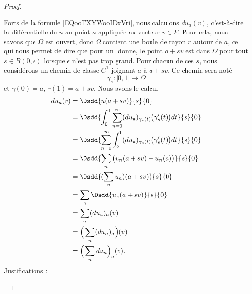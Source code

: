 \begin{proof}
\begin{subproof}
		Forts de la formule \eqref{EQooTXYWooIDxVri}, nous calculons \( du_a(v)\), c'est-à-dire la différentielle de \( u\) au point \( a\) appliquée au vecteur \( v\in F\). Pour cela, nous savons que \( \Omega\) est ouvert, donc \( \Omega\) contient une boule de rayon \( r\) autour de \( a\), ce qui nous permet de dire que pour un \( \) donné, le point \( a+sv\) est dans \( \Omega\) pour tout \( s\in B(0,\epsilon)\) lorsque \( \epsilon\) n'est pas trop grand. Pour chacun de ces \( s\), nous considérons un chemin de classe \( C^1\) joignant \( a\) à \( a+sv\). Ce chemin sera noté
		\begin{equation}
			\gamma_s\colon \mathopen[ 0 , 1 \mathclose]\to \Omega
		\end{equation}
		et \( \gamma(0)=a\), \( \gamma(1)=a+sv\). Nous avons le calcul
		\begin{subequations}
			\begin{align}
				du_a(v) & =\Dsdd{ u(a+sv) }{s}{0}                                                                                                    \\
				        & =\Dsdd{ \int_0^1\sum_{n=0}^{\infty}(du_n)_{\gamma_s(t)}\big( \gamma_s'(t) \big)dt }{s}{0}                                  \\
				        & =\Dsdd{ \sum_{n=0}^{\infty} \int_0^1(du_n)_{\gamma_s(t)}\big( \gamma'_s(t) \big)dt  }{s}{0}    \label{SUBEQooFSPSooCPErXj} \\
				        & =\Dsdd{ \sum_n\big( u_n(a+sv)-u_n(a) \big) }{s}{0}                                                                         \\
				        & =\Dsdd{ (\sum_nu_n)(a+sv) }{s}{0}                                                                                          \\
				        & =\sum_n\Dsdd{ u_n(a+sv) }{s}{0}    \label{SUBEQooDQODooIPMfDo}                                                             \\
				        & =\sum_n(du_n)_a(v)                                                                                                         \\
				        & =\Big( \sum_n(du_n)_a \Big)(v)                                                                                             \\
				        & =\Big( \sum_ndu_n \Big)_a(v)\label{SUBEQooQGOQooLvXuaX}.
			\end{align}
		\end{subequations}
		Justifications :
		\begin{itemize}

\end{itemize}
\end{subproof}
\end{proof}
